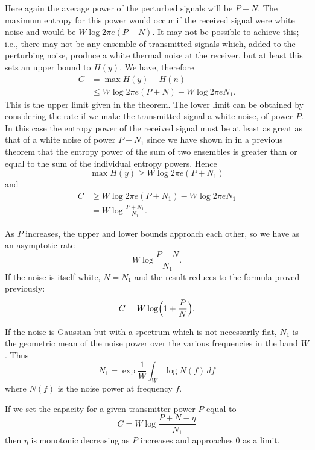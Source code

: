 Here again the average power of the perturbed signals will be $P+N$.  The
maximum entropy for this power would occur if the received signal were
white noise and would be $W\log 2\pi e(P+N)$.  It may not be possible to
achieve this; i.e., there may not be any ensemble of transmitted signals
which, added to the perturbing noise, produce a white thermal noise at the
receiver, but at least this sets an upper bound to $H(y)$.  We have,
therefore
\begin{align*}
C&=\max H(y) - H(n)\\
&\leq W \log 2\pi e(P+N)-W\log 2\pi e N_1.
\end{align*}
This is the upper limit given in the theorem.  The lower limit can be
obtained by considering the rate if we make the transmitted signal a white
noise, of power $P$.  In this case the entropy power of the received signal
must be at least as great as that of a white noise of power $P+N_1$ since
we have shown in in a previous theorem
that the entropy power of the sum of two ensembles is greater than or
equal to the sum of the individual entropy powers.  Hence
$$
\max H(y)\geq W\log 2\pi e(P+N_1)
$$
and
\begin{align*}
C&\geq W \log 2\pi e(P+N_1)-W\log 2\pi e N_1\\
&=W\log\frac{P+N_1}{N_1}.
\end{align*}

As $P$ increases, the upper and lower bounds
approach each other, so we have as an asymptotic rate
$$
W\log\frac{P+N}{N_1}.
$$
If the noise is itself white, $N=N_1$ and the result reduces to the formula
proved previously:
$$
C=W\log\Bigl(1+\frac P N\Bigr).
$$

If the noise is Gaussian but with a spectrum which is not necessarily flat,
$N_1$ is the geometric mean of the noise power over the various frequencies
in the band $W$.  Thus
$$
N_1=\exp\frac1W\int_W \log N(f)\,df
$$
where $N(f)$ is the noise power at frequency $f$.

\begin{theorem}
\label{thm:19}
If we set the capacity for a given transmitter power $P$ equal to
$$
C=W\log\frac{P+N-\eta}{N_1}
$$
then $\eta$ is monotonic decreasing as $P$ increases and approaches 0 as
a limit.
\end{theorem}

